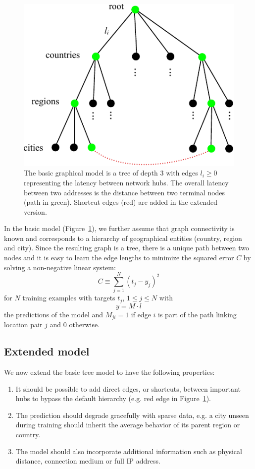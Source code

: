 \documentclass[10pt,a4paper,notitlepage,twocolumn]{article}
\begin{document}
\begin{figure}[h]
\centering
\includegraphics[width=0.8\columnwidth]{tree}
\caption{The basic graphical model is a tree of depth 3 with edges $l_i\ge0$ representing the latency between network hubs.
The overall latency between two addresses is the distance between two terminal nodes (path in green).
Shortcut edges (red) are added in the extended version.
}
\label{fig:tree}
\end{figure}


In the basic model (Figure~\ref{fig:tree}), we further assume that graph connectivity is known and corresponds to a hierarchy of geographical entities (country, region and city).
Since the resulting graph is a tree, there is a unique path between two nodes and it is easy to learn the edge lengths to minimize the squared error $C$ by solving a non-negative linear system:
\begin{equation} \label{eq:cost}
C \equiv \sum_{j=1}^N(t_j-y_j)^2
\end{equation}
for $N$ training examples with targets $t_j$, $1\le j\le N$ with
\begin{equation} \label{eq:y}
y = M\cdot l
\end{equation}
the predictions of the model and $M_{ji}=1$ if edge $i$ is part of the path linking location pair $j$ and 0 otherwise.


\subsection{Extended model}

We now extend the basic tree model to have the following properties:
\begin{enumerate}
\item It should be possible to add direct edges, or shortcuts, between important hubs to bypass the default hierarchy (e.g. red edge in Figure~\ref{fig:tree}).
\item The prediction should degrade gracefully with sparse data, e.g. a city unseen during training should inherit the average behavior of its parent region or country.
\item The model should also incorporate additional information such as physical distance, connection medium or full IP address.
\end{enumerate}
\end{document}
